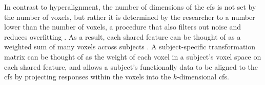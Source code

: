 In contrast to hyperalignment, the number of dimensions of the \ac{cfs} is not
set by the number of voxels, but rather it is determined by the researcher to a
number lower than the number of voxels, a procedure that also filters out noise
and reduces overfitting \citep{chen2015reduced}.
As a result, each shared feature can be thought of as a weighted sum of many
voxels across subjects \citep{kumar2020brainiak}.
A subject-specific transformation matrix can be thought of as the weight of each
voxel in a subject's voxel space on each shared feature, and allows a
subject's functionally data to be aligned to the \ac{cfs} by projecting
responses within the voxels into the $k$-dimensional \ac{cfs}.




